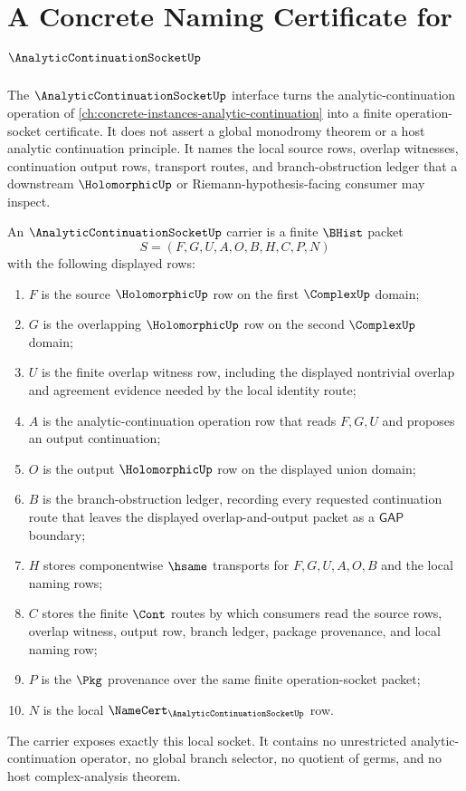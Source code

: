 \chapter{A Concrete Naming Certificate for $\AnalyticContinuationSocketUp$}
\label{ch:concrete-instances-analytic-continuation-socket-namecert}

The $\AnalyticContinuationSocketUp$ interface turns the analytic-continuation operation of \autoref{ch:concrete-instances-analytic-continuation} into a finite operation-socket certificate. It does not assert a global monodromy theorem or a host analytic continuation principle. It names the local source rows, overlap witnesses, continuation output rows, transport routes, and branch-obstruction ledger that a downstream $\HolomorphicUp$ or Riemann-hypothesis-facing consumer may inspect.

\begin{definition}
\label{def:analytic-continuation-socket-carrier}
An $\AnalyticContinuationSocketUp$ carrier is a finite $\BHist$ packet
$$
S=(F,G,U,A,O,B,H,C,P,N)
$$
with the following displayed rows:
\begin{enumerate}
\item $F$ is the source $\HolomorphicUp$ row on the first $\ComplexUp$ domain;
\item $G$ is the overlapping $\HolomorphicUp$ row on the second $\ComplexUp$ domain;
\item $U$ is the finite overlap witness row, including the displayed nontrivial overlap and agreement evidence needed by the local identity route;
\item $A$ is the analytic-continuation operation row that reads $F,G,U$ and proposes an output continuation;
\item $O$ is the output $\HolomorphicUp$ row on the displayed union domain;
\item $B$ is the branch-obstruction ledger, recording every requested continuation route that leaves the displayed overlap-and-output packet as a $\mathsf{GAP}$ boundary;
\item $H$ stores componentwise $\hsame$ transports for $F,G,U,A,O,B$ and the local naming rows;
\item $C$ stores the finite $\Cont$ routes by which consumers read the source rows, overlap witness, output row, branch ledger, package provenance, and local naming row;
\item $P$ is the $\Pkg$ provenance over the same finite operation-socket packet;
\item $N$ is the local $\NameCert_{\AnalyticContinuationSocketUp}$ row.
\end{enumerate}
The carrier exposes exactly this local socket. It contains no unrestricted analytic-continuation operator, no global branch selector, no quotient of germs, and no host complex-analysis theorem.
\end{definition}

